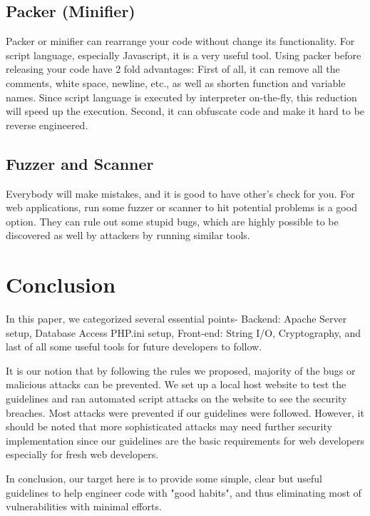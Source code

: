 \documentclass[conference]{IEEEtran}
\begin{document}
\subsection{Packer (Minifier)}
Packer or minifier can rearrange your code without change its
functionality.
For script language, especially Javascript, it is a very useful tool.
Using packer before releasing your code have 2 fold advantages:
First of all, it can remove all the comments, white space, newline, etc.,
as well as
shorten function and
variable names.
Since script language is executed by interpreter on-the-fly, this reduction
will speed up the execution.
Second, it can obfuscate code and make it hard to be reverse engineered.


\subsection{Fuzzer and Scanner}
Everybody will make mistakes, and it is good to have other's check for you.
For web applications, run some fuzzer or scanner to hit potential problems
is a good option.
They can rule out some stupid bugs, which are highly possible
to be discovered as well by attackers by running similar tools.

\section{Conclusion}
In this paper, we categorized several essential points- Backend: Apache Server setup, Database Access PHP.ini setup, Front-end: String I/O, Cryptography, and last of all some useful tools
for future developers to follow. 

It is our notion that by following the rules we proposed, majority of the bugs or malicious attacks can be
prevented. We set up a local host website to test the guidelines and ran automated script attacks on the website to see the security breaches. Most attacks were prevented
if our guidelines were followed. However, it should be noted that more sophisticated attacks may need further security implementation since our guidelines are the basic requirements
for web developers especially for fresh web developers.

In conclusion, our target here is to provide some simple, clear but useful guidelines
to help engineer code with "good habits", and thus
eliminating most of vulnerabilities with minimal efforts.


\end{document}
